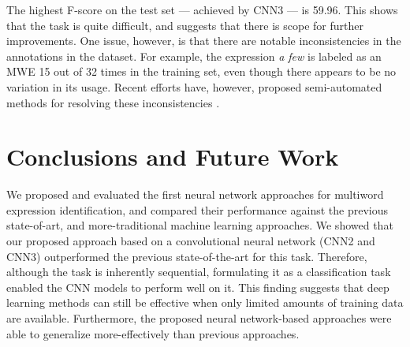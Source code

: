 \documentclass[11pt,a4paper]{article}
\begin{document}

The highest F-score on the test set --- achieved by CNN3 --- is
59.96. This shows that the task is quite difficult, and suggests that
there is scope for further improvements. One issue, however, is that
there are notable inconsistencies in the annotations in the dataset.
For example, the expression \textit{a few} is labeled as an MWE 15 out
of 32 times in the training set, even though there appears to be no
variation in its usage. Recent efforts have, however, proposed
semi-automated methods for resolving these inconsistencies
\cite{chan+:2017}.




\section{Conclusions and Future Work}

We proposed and evaluated the first neural network approaches for
multiword expression identification, and compared their performance
against the previous state-of-art, and more-traditional machine
learning approaches. We showed that our proposed approach based on a
convolutional neural network (CNN2 and CNN3) outperformed the previous
state-of-the-art for this task. 
Therefore, although the task is inherently sequential, formulating it as a classification task enabled the CNN models to perform well on it. This finding suggests that deep
learning methods can still be effective when only limited amounts of
training data are available. Furthermore, the proposed neural
network-based approaches were able to generalize more-effectively than
previous approaches.
\end{document}
